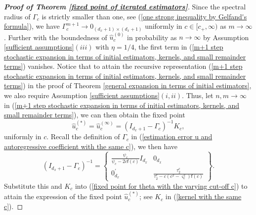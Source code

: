 \documentclass[11pt, letterpaper]{article}
\numberwithin{algorithm}{section}
\numberwithin{assumption}{section}
\numberwithin{lemma}{section}
\numberwithin{theorem}{section}
\numberwithin{corollary}{section}
\numberwithin{remark}{section}
\numberwithin{equation}{section}
\numberwithin{figure}{section}
\numberwithin{table}{section}
\begin{document}
\begin{proof}[\textnormal{\textbf{Proof of Theorem \ref{fixed point of iterated estimators}}}]
Since the spectral radius of $\Gamma_{c}$ is strictly smaller than one, see (\ref{one strong inequality by Gelfand's formula}), we have $\Gamma_{c}^{m + 1} \to 0_{(d_{x} + 1) \times (d_{x} + 1)}$ uniformly in $c \in [c_{+}, \infty)$ as $m \to \infty$. Further with the boundedness of $\widehat{u}_{c}^{(0)}$ in probability as $n \to \infty$ by Assumption \ref{sufficient assumptions}$(iii)$ with $\eta = 1/4$, the first term in (\ref{m+1 step stochastic expansion in terms of initial estimators, kernels, and small remainder terms}) vanishes. Notice that to attain the recursive representation (\ref{m+1 step stochastic expansion in terms of initial estimators, kernels, and small remainder terms}) in the proof of Theorem \ref{general expansion in terms of initial estimators}, we also require Assumption \ref{sufficient assumptions}$(i, ii)$. Thus, let $n, m \to \infty$ in (\ref{m+1 step stochastic expansion in terms of initial estimators, kernels, and small remainder terms}), we can then obtain the fixed point
\begin{equation} \label{fixed point for theta with the varying cut-off c}
\widehat{u}_{c}^{(\ast)} = \widehat{u}_{c}^{(\infty)} = (I_{d_{x} + 1} - \Gamma_{c})^{-1} K_{c},
\end{equation}
uniformly in $c$. Recall the definition of $\Gamma_{c}$ in (\ref{estimation error u and autoregressive coefficient with the same c}), we then have
\begin{equation*}
(I_{d_{x} + 1} - \Gamma_{c})^{-1} =
\begin{Bmatrix}
\frac{\psi_{c}}{\psi_{c} - 2 c \mathsf{f}(c)} I_{d_{x}} & 0_{d_{x}} \\
0_{d_{x}}^{\prime} & \frac{\tau_{2}^{c}}{\tau_{2}^{c} - c (c^{2} - \varsigma_{c}^{2}) \mathsf{f}(c)}
\end{Bmatrix}
.
\end{equation*}
Substitute this and $K_{c}$ into (\ref{fixed point for theta with the varying cut-off c}) to attain the expression of the fixed point $\widehat{u}_{c}^{(\ast)}$; see $K_{c}$ in (\ref{kernel with the same c}).


\end{proof}
\end{document}
